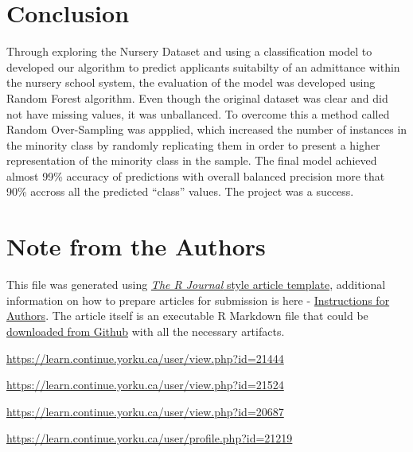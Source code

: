 \newpage

\hypertarget{conclusion}{%
\section{Conclusion}\label{conclusion}}

Through exploring the Nursery Dataset and using a classification model
to developed our algorithm to predict applicants suitabilty of an
admittance within the nursery school system, the evaluation of the model
was developed using Random Forest algorithm. Even though the original
dataset was clear and did not have missing values, it was unballanced.
To overcome this a method called Random Over-Sampling was appplied,
which increased the number of instances in the minority class by
randomly replicating them in order to present a higher representation of
the minority class in the sample. The final model achieved almost 99\%
accuracy of predictions with overall balanced precision more that 90\%
accross all the predicted ``class'' values. The project was a success.



\newpage

\hypertarget{note-from-the-authors}{%
\section{Note from the Authors}\label{note-from-the-authors}}

This file was generated using
\href{https://github.com/rstudio/rticles}{\emph{The R Journal} style
article template}, additional information on how to prepare articles for
submission is here -
\href{https://journal.r-project.org/share/author-guide.pdf}{Instructions
for Authors}. The article itself is an executable R Markdown file that
could be
\href{https://github.com/ivbsoftware/scda1010-lab1/tree/master/docs/R_Journal/csda1010-lab1lab1}{downloaded
from Github} with all the necessary artifacts.


\address{%
Viviane Adohouannon\\
York University School of Continuing Studies\\
\\
}
\url{https://learn.continue.yorku.ca/user/view.php?id=21444}

\address{%
Kate Alexander\\
York University School of Continuing Studies\\
\\
}
\url{https://learn.continue.yorku.ca/user/view.php?id=21524}

\address{%
Diana Azbel\\
York University School of Continuing Studies\\
\\
}
\url{https://learn.continue.yorku.ca/user/view.php?id=20687}

\address{%
Igor Baranov\\
York University School of Continuing Studies\\
\\
}
\url{https://learn.continue.yorku.ca/user/profile.php?id=21219}

